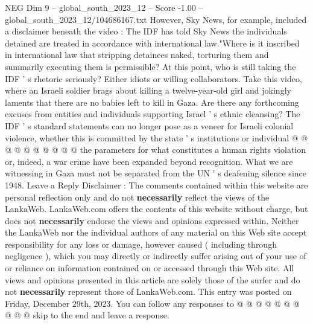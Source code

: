 \begin{textsample}{NEG Dim 9 – global\_south\_2023\_12 – Score -1.00 – global\_south\_2023\_12/104686167.txt}
However, Sky News, for example, included a disclaimer beneath the video : The IDF has told Sky News the individuals detained are treated in accordance with international law."Where is it inscribed in international law that stripping detainees naked, torturing them and summarily executing them is permissible?
At this point, who is still taking the IDF ' s rhetoric seriously?
Either idiots or willing collaborators.
Take this video, where an Israeli soldier brags about killing a twelve-year-old girl and jokingly laments that there are no babies left to kill in Gaza.
Are there any forthcoming excuses from entities and individuals supporting Israel ' s ethnic cleansing?
The IDF ' s standard statements can no longer pose as a veneer for Israeli colonial violence, whether this is committed by the state ' s institutions or individual @ @ @ @ @ @ @ @ @ @ the parameters for what constitutes a human rights violation or, indeed, a war crime have been expanded beyond recognition.
What we are witnessing in Gaza must not be separated from the UN ' s deafening silence since 1948.
Leave a Reply Disclaimer : The comments contained within this website are personal reflection only and do not \textbf{necessarily} reflect the views of the LankaWeb.
LankaWeb.com offers the contents of this website without charge, but does not \textbf{necessarily} endorse the views and opinions expressed within.
Neither the LankaWeb nor the individual authors of any material on this Web site accept responsibility for any loss or damage, however caused ( including through negligence ), which you may directly or indirectly suffer arising out of your use of or reliance on information contained on or accessed through this Web site.
All views and opinions presented in this article are solely those of the surfer and do not \textbf{necessarily} represent those of LankaWeb.com.
This entry was posted on Friday, December 29th, 2023.
You can follow any responses to @ @ @ @ @ @ @ @ @ @ skip to the end and leave a response.

\end{textsample}
